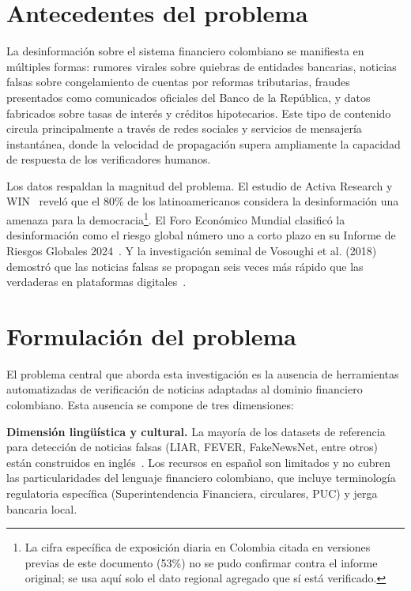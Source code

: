 \section{Antecedentes del problema}

La desinformación sobre el sistema financiero colombiano se manifiesta en múltiples formas: rumores virales sobre quiebras de entidades bancarias, noticias falsas sobre congelamiento de cuentas por reformas tributarias, fraudes presentados como comunicados oficiales del Banco de la República, y datos fabricados sobre tasas de interés y créditos hipotecarios. Este tipo de contenido circula principalmente a través de redes sociales y servicios de mensajería instantánea, donde la velocidad de propagación supera ampliamente la capacidad de respuesta de los verificadores humanos.

Los datos respaldan la magnitud del problema. El estudio de Activa Research y WIN~\cite{ActivaResearch2022} reveló que el 80\% de los latinoamericanos considera la desinformación una amenaza para la democracia\footnote{La cifra específica de exposición diaria en Colombia citada en versiones previas de este documento (53\%) no se pudo confirmar contra el informe original; se usa aquí solo el dato regional agregado que sí está verificado.}. El Foro Económico Mundial clasificó la desinformación como el riesgo global número uno a corto plazo en su Informe de Riesgos Globales 2024~\cite{WEF2024}. Y la investigación seminal de Vosoughi et al. (2018) demostró que las noticias falsas se propagan seis veces más rápido que las verdaderas en plataformas digitales~\cite{Vosoughi2018}.

\section{Formulación del problema}

El problema central que aborda esta investigación es la ausencia de herramientas automatizadas de verificación de noticias adaptadas al dominio financiero colombiano. Esta ausencia se compone de tres dimensiones:

\textbf{Dimensión lingüística y cultural.} La mayoría de los datasets de referencia para detección de noticias falsas (LIAR, FEVER, FakeNewsNet, entre otros) están construidos en inglés~\cite{Oshikawa2020}. Los recursos en español son limitados y no cubren las particularidades del lenguaje financiero colombiano, que incluye terminología regulatoria específica (Superintendencia Financiera, circulares, PUC) y jerga bancaria local.

